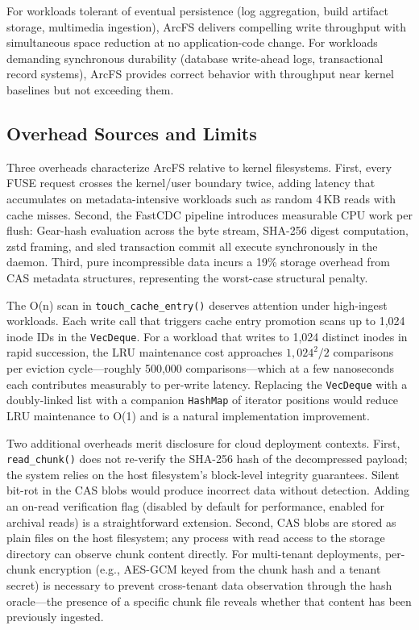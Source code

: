 \documentclass[5p,times]{elsarticle}
\begin{document}
For workloads tolerant of eventual persistence (log aggregation, build
artifact storage, multimedia ingestion), ArcFS delivers compelling write
throughput with simultaneous space reduction at no application-code change.
For workloads demanding synchronous durability (database write-ahead logs,
transactional record systems), ArcFS provides correct behavior with
throughput near kernel baselines but not exceeding them.

\subsection{Overhead Sources and Limits}

Three overheads characterize ArcFS relative to kernel filesystems. First,
every FUSE request crosses the kernel/user boundary twice, adding latency
that accumulates on metadata-intensive workloads such as random 4\,KB reads
with cache misses. Second, the FastCDC pipeline introduces measurable CPU
work per flush: Gear-hash evaluation across the byte stream, SHA-256 digest
computation, zstd framing, and sled transaction commit all execute
synchronously in the daemon. Third, pure incompressible data incurs a 19\%
storage overhead from CAS metadata structures, representing the worst-case
structural penalty.

The O(n) scan in \texttt{touch\_cache\_entry()} deserves attention under
high-ingest workloads. Each write call that triggers cache entry promotion
scans up to 1,024 inode IDs in the \texttt{VecDeque}.  For a workload that
writes to 1,024 distinct inodes in rapid succession, the LRU maintenance
cost approaches $1{,}024^2 / 2$ comparisons per eviction cycle---roughly
500,000 comparisons---which at a few nanoseconds each contributes
measurably to per-write latency.  Replacing the \texttt{VecDeque} with a
doubly-linked list with a companion \texttt{HashMap} of iterator positions
would reduce LRU maintenance to O(1) and is a natural implementation
improvement.

Two additional overheads merit disclosure for cloud deployment contexts.
First, \texttt{read\_chunk()} does not re-verify the SHA-256 hash of
the decompressed payload; the system relies on the host filesystem's
block-level integrity guarantees.  Silent bit-rot in the CAS blobs
would produce incorrect data without detection.  Adding an on-read
verification flag (disabled by default for performance, enabled for
archival reads) is a straightforward extension.  Second, CAS blobs are
stored as plain files on the host filesystem; any process with read
access to the storage directory can observe chunk content directly.
For multi-tenant deployments, per-chunk encryption (e.g., AES-GCM keyed
from the chunk hash and a tenant secret) is necessary to prevent
cross-tenant data observation through the hash oracle---the presence
of a specific chunk file reveals whether that content has been
previously ingested.
\end{document}
